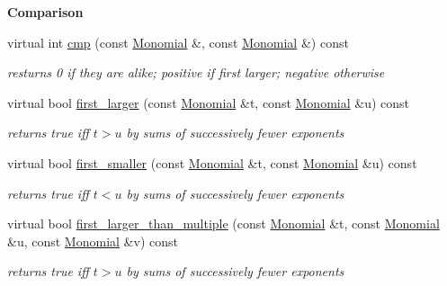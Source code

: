 \begin{Indent}\textbf{ Comparison}\par
\begin{DoxyCompactItemize}
\item 
\mbox{\label{class_cached_w_grevlex___ordering_ad45e0d824f910059185ff5b63a8e2add}} 
virtual int \hyperlink{class_cached_w_grevlex___ordering_ad45e0d824f910059185ff5b63a8e2add}{cmp} (const \hyperlink{class_monomial}{Monomial} \&, const \hyperlink{class_monomial}{Monomial} \&) const
\begin{DoxyCompactList}\small\item\em resturns 0 if they are alike; positive if first larger; negative otherwise \end{DoxyCompactList}\item 
\mbox{\label{class_cached_w_grevlex___ordering_a2a82044a58fc3594975726072243b51a}} 
virtual bool \hyperlink{class_cached_w_grevlex___ordering_a2a82044a58fc3594975726072243b51a}{first\+\_\+larger} (const \hyperlink{class_monomial}{Monomial} \&t, const \hyperlink{class_monomial}{Monomial} \&u) const
\begin{DoxyCompactList}\small\item\em returns {\ttfamily true} iff $t>u$ by sums of successively fewer exponents \end{DoxyCompactList}\item 
\mbox{\label{class_cached_w_grevlex___ordering_abcb7c620cce85cc4b94bf742fc1cafc3}} 
virtual bool \hyperlink{class_cached_w_grevlex___ordering_abcb7c620cce85cc4b94bf742fc1cafc3}{first\+\_\+smaller} (const \hyperlink{class_monomial}{Monomial} \&t, const \hyperlink{class_monomial}{Monomial} \&u) const
\begin{DoxyCompactList}\small\item\em returns {\ttfamily true} iff $t< u$ by sums of successively fewer exponents \end{DoxyCompactList}\item 
\mbox{\label{class_cached_w_grevlex___ordering_a61786473b35507f0862f72fb0926c001}} 
virtual bool \hyperlink{class_cached_w_grevlex___ordering_a61786473b35507f0862f72fb0926c001}{first\+\_\+larger\+\_\+than\+\_\+multiple} (const \hyperlink{class_monomial}{Monomial} \&t, const \hyperlink{class_monomial}{Monomial} \&u, const \hyperlink{class_monomial}{Monomial} \&v) const
\begin{DoxyCompactList}\small\item\em returns {\ttfamily true} iff $t>u$ by sums of successively fewer exponents \end{DoxyCompactList}\end{DoxyCompactItemize}
\end{Indent}
